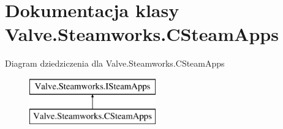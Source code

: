 \hypertarget{class_valve_1_1_steamworks_1_1_c_steam_apps}{}\section{Dokumentacja klasy Valve.\+Steamworks.\+C\+Steam\+Apps}
\label{class_valve_1_1_steamworks_1_1_c_steam_apps}
Diagram dziedziczenia dla Valve.\+Steamworks.\+C\+Steam\+Apps\begin{figure}[H]
\begin{center}
\leavevmode
\includegraphics[height=2.000000cm]{class_valve_1_1_steamworks_1_1_c_steam_apps}
\end{center}
\end{figure}
